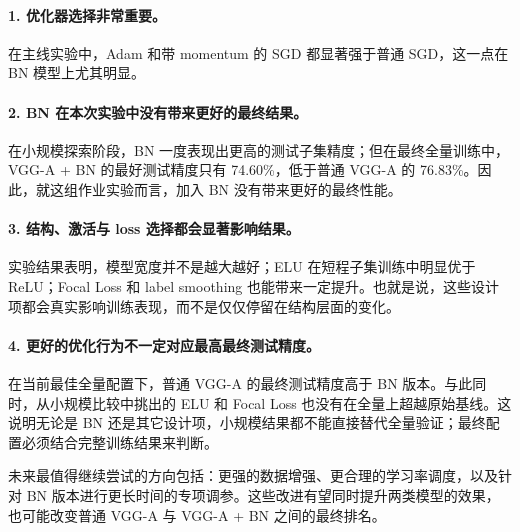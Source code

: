 \documentclass[11pt]{article}
\begin{document}
\paragraph{1. 优化器选择非常重要。}
在主线实验中，Adam 和带 momentum 的 SGD 都显著强于普通 SGD，这一点在 BN 模型上尤其明显。

\paragraph{2. BN 在本次实验中没有带来更好的最终结果。}
在小规模探索阶段，BN 一度表现出更高的测试子集精度；但在最终全量训练中，VGG-A + BN 的最好测试精度只有 74.60\%，低于普通 VGG-A 的 76.83\%。因此，就这组作业实验而言，加入 BN 没有带来更好的最终性能。

\paragraph{3. 结构、激活与 loss 选择都会显著影响结果。}
实验结果表明，模型宽度并不是越大越好；ELU 在短程子集训练中明显优于 ReLU；Focal Loss 和 label smoothing 也能带来一定提升。也就是说，这些设计项都会真实影响训练表现，而不是仅仅停留在结构层面的变化。

\paragraph{4. 更好的优化行为不一定对应最高最终测试精度。}
在当前最佳全量配置下，普通 VGG-A 的最终测试精度高于 BN 版本。与此同时，从小规模比较中挑出的 ELU 和 Focal Loss 也没有在全量上超越原始基线。这说明无论是 BN 还是其它设计项，小规模结果都不能直接替代全量验证；最终配置必须结合完整训练结果来判断。

未来最值得继续尝试的方向包括：更强的数据增强、更合理的学习率调度，以及针对 BN 版本进行更长时间的专项调参。这些改进有望同时提升两类模型的效果，也可能改变普通 VGG-A 与 VGG-A + BN 之间的最终排名。
\end{document}
